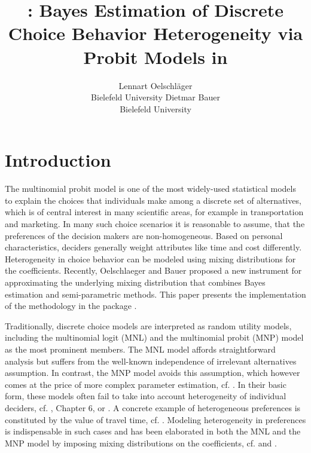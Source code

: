 \documentclass[article]{jss}
\author{Lennart Oelschl\"ager \\Bielefeld University \And Dietmar Bauer\\Bielefeld University}
\title{\pkg{RprobitB}: Bayes Estimation of Discrete Choice Behavior Heterogeneity via Probit Models in \proglang{R}}
\newcommand{\fct}[1]{\code{#1()}}
\begin{document}



\section{Introduction}
\label{sec:introduction}

The multinomial probit model is one of the most widely-used statistical models to explain the choices that individuals make among a discrete set of alternatives, which is of central interest in many scientific areas, for example in transportation and marketing. In many such choice scenarios it is reasonable to assume, that the preferences of the decision makers are non-homogeneous. Based on personal characteristics, deciders generally weight attributes like time and cost differently. Heterogeneity in choice behavior can be modeled using mixing distributions for the coefficients. Recently, Oelschlaeger and Bauer proposed a new instrument for approximating the underlying mixing distribution that combines Bayes estimation and semi-parametric methods. This paper presents the implementation of the methodology in the  package .

Traditionally, discrete choice models are interpreted as random utility models, including the multinomial logit (MNL) and the multinomial probit (MNP) model as the most prominent members. The MNL model affords straightforward analysis but suffers from the well-known independence of irrelevant alternatives assumption. In contrast, the MNP model avoids this assumption, which however comes at the price of more complex parameter estimation, cf. \cite{Train:2009}. In their basic form, these models often fail to take into account heterogeneity of individual deciders, cf. \cite{Train:2009}, Chapter 6, or \cite{Train:2016}. A concrete example of heterogeneous preferences is constituted by the value of travel time, cf. \cite{Cirillo:2006}. Modeling heterogeneity in preferences is indispensable in such cases and has been elaborated in both the MNL and the MNP model by imposing mixing distributions on the coefficients, cf. \cite{Train:2009} and \cite{Bhat:2011}.
\end{document}
